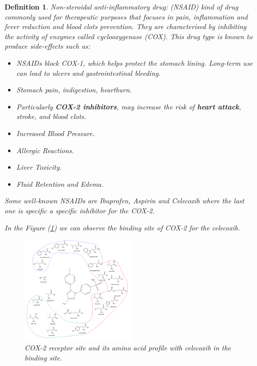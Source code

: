 \documentclass[12pt,letterpaper]{article}
\newtheorem{definition}{Definition}
\begin{document}
\begin{multicols}{2}
\begin{definition}
Non-steroidal anti-inflammatory drug: (NSAID) kind of drug commonly used for therapeutic purposes that focuses in pain, inflammation and fever reduction and blood clots prevention. They are characterised by inhibiting the activity of enzymes called cyclooxygenase (COX). This drug type is known to produce side-effects such as:
\begin{itemize}
\item NSAIDs block COX-1, which helps protect the stomach lining. Long-term use can lead to ulcers and gastrointestinal bleeding. 
\item Stomach pain, indigestion, heartburn.
\item Particularly \textbf{COX-2 inhibitors}, may increase the risk of \textbf{heart attack}, stroke, and blood clots.
\item Increased Blood Pressure.
\item Allergic Reactions.
\item Liver Toxicity.
\item Fluid Retention and Edema.
\end{itemize}
Some well-known NSAIDs are Ibuprofen, Aspirin and Celecoxib where the last one is specific a specific inhibitor for the COX-2.\cite{Cox2InhibitorsReview}\par
In the Figure (\ref{Cox2BondingSiteFigureRef}) we can observe the binding site of COX-2 for the celecoxib.
\begin{figure}[H]
\centering
\includegraphics[width=0.5\textwidth]{GeneralSources/COXII-receptor.png}
\caption{COX-2 receptor site and its amino acid profile with celecoxib in the binding site.\cite{Cox2BondingSiteFigure}}
\label{Cox2BondingSiteFigureRef}
\end{figure}
\end{definition}


\end{multicols}
\end{document}

